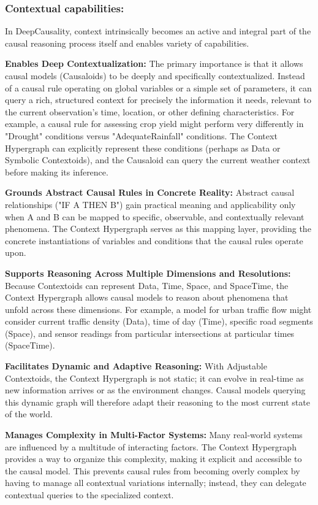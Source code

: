 \subsubsection{Contextual capabilities:}

In DeepCausality, context intrinsically becomes an active and integral part of the causal reasoning process itself and enables variety of capabilities. 

\textbf{Enables Deep Contextualization: }
The primary importance is that it allows causal models (Causaloids) to be deeply and specifically contextualized. Instead of a causal rule operating on global variables or a simple set of parameters, it can query a rich, structured context for precisely the information it needs, relevant to the current observation's time, location, or other defining characteristics.
For example, a causal rule for assessing crop yield might perform very differently in "Drought" conditions versus "AdequateRainfall" conditions. The Context Hypergraph can explicitly represent these conditions (perhaps as Data or Symbolic Contextoids), and the Causaloid can query the current weather context before making its inference.

\textbf{Grounds Abstract Causal Rules in Concrete Reality:} Abstract causal relationships ("IF A THEN B") gain practical meaning and applicability only when A and B can be mapped to specific, observable, and contextually relevant phenomena. The Context Hypergraph serves as this mapping layer, providing the concrete instantiations of variables and conditions that the causal rules operate upon.

\textbf{Supports Reasoning Across Multiple Dimensions and Resolutions:} Because Contextoids can represent Data, Time, Space, and SpaceTime, the Context Hypergraph allows causal models to reason about phenomena that unfold across these dimensions. For example, a model for urban traffic flow might consider current traffic density (Data), time of day (Time), specific road segments (Space), and sensor readings from particular intersections at particular times (SpaceTime).

\textbf{Facilitates Dynamic and Adaptive Reasoning:} With Adjustable Contextoids, the Context Hypergraph is not static; it can evolve in real-time as new information arrives or as the environment changes. Causal models querying this dynamic graph will therefore adapt their reasoning to the most current state of the world.

\textbf{Manages Complexity in Multi-Factor Systems: }Many real-world systems are influenced by a multitude of interacting factors. The Context Hypergraph provides a way to organize this complexity, making it explicit and accessible to the causal model. This prevents causal rules from becoming overly complex by having to manage all contextual variations internally; instead, they can delegate contextual queries to the specialized context.

